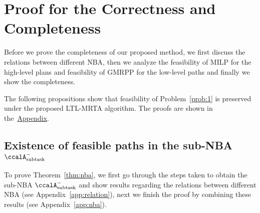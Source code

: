 \documentclass[Afour,sageh,times]{sagej}
\newcommand{\auto}[1]{\ccalA_{\textup{#1}}}
\begin{document}
{{\section{Proof for the Correctness and Completeness}\label{app:correctness}
Before we prove the completeness  of our proposed method, we first discuss the relations between different NBA, then we analyze the feasibility of MILP for the high-level plans and feasibility of GMRPP for the low-level paths and finally we show the completeness.

  The following propositions show that feasibility of Problem~\ref{prob:1} is preserved under the proposed LTL-MRTA algorithm. The proofs are shown in the~\hyperref[sec:appendix]{Appendix}.

  \subsection{Existence of feasible paths in the sub-NBA $\auto{subtask}^-$}\label{app:existence}
  To prove Theorem~\ref{thm:nba},  we first go through the steps taken to obtain the sub-NBA $\auto{subtask}^-$ and show results regarding the relations between different NBA (see Appendix~\ref{app:relation}), next we finish the proof by combining these results (see Appendix~\ref{app:nba}).
}}
\end{document}
